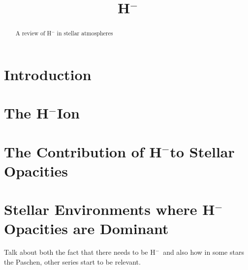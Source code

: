 \documentclass{emulateapj}
\def\h{H$^-$}
\begin{document}
\begin{abstract}
A review of H$^-$ in stellar atmospheres
\end{abstract}

\title{\h}

\section{Introduction}


\section{The \h Ion}

\section{The Contribution of \h to Stellar Opacities}

\section{Stellar Environments where \h Opacities are Dominant}
Talk about both the fact that there needs to be \h\ and also how in
some stars the Paschen, other series start to be relevant.



\end{document}
